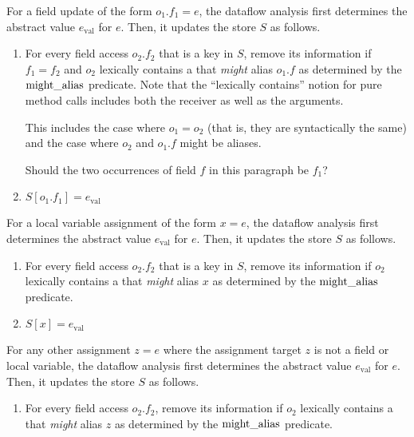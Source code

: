 For a field update of the form $o_1.f_1 = e$, the
dataflow analysis first determines the abstract value $e_\text{val}$ for $e$.
Then, it updates the store $S$ as follows.
\begin{enumerate}
    \item For every field access $o_2.f_2$ that is a key in $S$, remove its
      information if $f_1 = f_2$ and
      $o_2$ lexically contains a  that \emph{might}
        alias $o_1.f$ as determined by the $\operatorname{might\_alias}$
        predicate.
      Note that the ``lexically contains'' notion for pure method calls
        includes both the receiver as well as the arguments.

      This includes the case where $o_1 = o_2$ (that is, they are
      syntactically the same) and the case where  $o_2$ and $o_1.f$ might be
      aliases.

      \begin{workinprogress}
        Should the two occurrences of field $f$ in this paragraph be $f_1$?
      \end{workinprogress}

    \item $S[o_1.f_1] = e_\text{val}$
\end{enumerate}



For a local variable assignment of the form $x = e$,
the dataflow analysis first determines the abstract value $e_\text{val}$ for
$e$.
Then, it updates the store $S$ as follows.
\begin{enumerate}
    \item For every field access $o_2.f_2$ that is a key in $S$,
      remove its information if $o_2$ lexically contains a
       that \emph{might} alias $x$ as determined
      by the $\operatorname{might\_alias}$ predicate.
    \item $S[x] = e_\text{val}$
\end{enumerate}


For any other assignment $z = e$ where the
assignment target $z$ is not a field or local variable,
the dataflow analysis first determines the abstract value $e_\text{val}$ for
$e$.
Then, it updates the store $S$ as follows.
\begin{enumerate}
    \item For every field access $o_2.f_2$, remove its information if
    $o_2$ lexically contains a  that \emph{might}
    alias $z$ as determined by the $\operatorname{might\_alias}$ predicate.
\end{enumerate}


